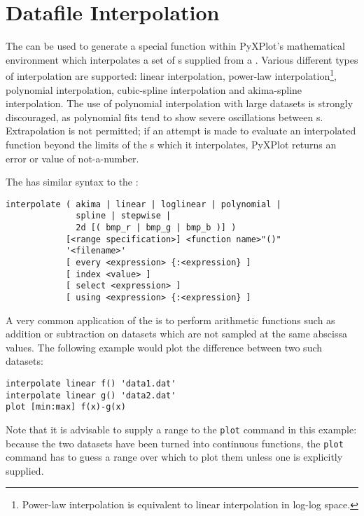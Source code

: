 \section{Datafile Interpolation}
\label{sec:spline_command}

The  can be used to generate a special function within
PyXPlot's mathematical environment which interpolates a set of \datapoint s
supplied from a \datafile.  Various different types of interpolation are
supported: linear interpolation, power-law interpolation\footnote{Power-law
interpolation is equivalent to linear interpolation in log-log space.},
polynomial interpolation, cubic-spline interpolation and akima-spline
interpolation. The use of polynomial interpolation with large datasets is
strongly discouraged, as polynomial fits tend to show severe oscillations
between \datapoint s.  Extrapolation is not permitted; if an attempt is made to
evaluate an interpolated function beyond the limits of the \datapoint s which
it interpolates, PyXPlot returns an error or value of not-a-number.

The  has similar syntax to the :

\begin{verbatim}
interpolate ( akima | linear | loglinear | polynomial |
              spline | stepwise |
              2d [( bmp_r | bmp_g | bmp_b )] )
            [<range specification>] <function name>"()"
            '<filename>'
            [ every <expression> {:<expression} ]
            [ index <value> ]
            [ select <expression> ]
            [ using <expression> {:<expression} ]
\end{verbatim}

A very common application of the  is to perform arithmetic
functions such as addition or subtraction on datasets which are not sampled at
the same abscissa values. The following example would plot the difference
between two such datasets:

\begin{verbatim}
interpolate linear f() 'data1.dat'
interpolate linear g() 'data2.dat'
plot [min:max] f(x)-g(x)
\end{verbatim}

\noindent Note that it is advisable to supply a range to the {\tt plot} command
in this example: because the two datasets have been turned into continuous
functions, the {\tt plot} command has to guess a range over which to plot them
unless one is explicitly supplied.

